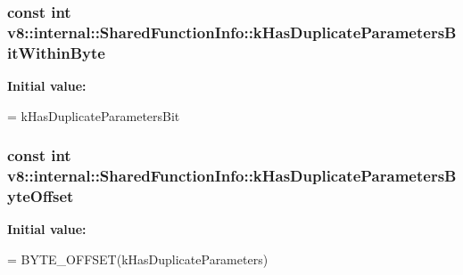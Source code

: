 \subsubsection[{\texorpdfstring{k\+Has\+Duplicate\+Parameters\+Bit\+Within\+Byte}{kHasDuplicateParametersBitWithinByte}}]{\setlength{\rightskip}{0pt plus 5cm}const int v8\+::internal\+::\+Shared\+Function\+Info\+::k\+Has\+Duplicate\+Parameters\+Bit\+Within\+Byte\hspace{0.3cm}{\ttfamily [static]}}\hypertarget{classv8_1_1internal_1_1_shared_function_info_ac6f759da3e5bb4abb4e984f27540c7fd}{}\label{classv8_1_1internal_1_1_shared_function_info_ac6f759da3e5bb4abb4e984f27540c7fd}
{\bfseries Initial value\+:}
\begin{DoxyCode}
=
      kHasDuplicateParametersBit %
\end{DoxyCode}
\subsubsection[{\texorpdfstring{k\+Has\+Duplicate\+Parameters\+Byte\+Offset}{kHasDuplicateParametersByteOffset}}]{\setlength{\rightskip}{0pt plus 5cm}const int v8\+::internal\+::\+Shared\+Function\+Info\+::k\+Has\+Duplicate\+Parameters\+Byte\+Offset\hspace{0.3cm}{\ttfamily [static]}}\hypertarget{classv8_1_1internal_1_1_shared_function_info_a57fb98be2c191b5616aaf981e42d5604}{}\label{classv8_1_1internal_1_1_shared_function_info_a57fb98be2c191b5616aaf981e42d5604}
{\bfseries Initial value\+:}
\begin{DoxyCode}
=
      BYTE\_OFFSET(kHasDuplicateParameters)
\end{DoxyCode}
